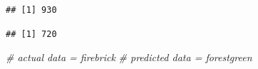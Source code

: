 \documentclass[
]{article}
\newenvironment{Shaded}{\begin{snugshade}}{\end{snugshade}}
\newcommand{\CommentTok}[1]{\textcolor[rgb]{0.56,0.35,0.01}{\textit{#1}}}
\newcommand{\DecValTok}[1]{\textcolor[rgb]{0.00,0.00,0.81}{#1}}
\newcommand{\FunctionTok}[1]{\textcolor[rgb]{0.00,0.00,0.00}{#1}}
\newcommand{\NormalTok}[1]{#1}
\newcommand{\OtherTok}[1]{\textcolor[rgb]{0.56,0.35,0.01}{#1}}
\newcommand{\SpecialCharTok}[1]{\textcolor[rgb]{0.00,0.00,0.00}{#1}}
\begin{document}
\begin{verbatim}
## [1] 930
\end{verbatim}

\begin{Shaded}
\end{Shaded}

\begin{verbatim}
## [1] 720
\end{verbatim}

\begin{Shaded}
\begin{Highlighting}[]
\CommentTok{\# actual data = firebrick}
\CommentTok{\# predicted data = forestgreen}


\end{Highlighting}
\end{Shaded}
\end{document}
